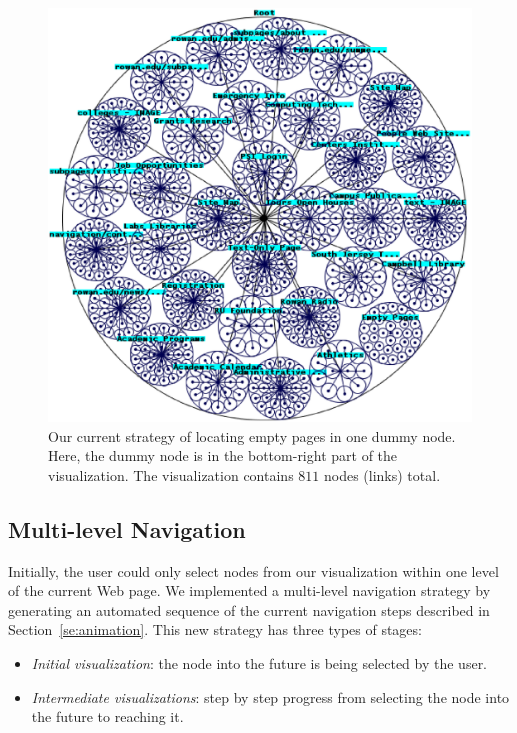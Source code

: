 \documentclass[]{article}
\begin{document}
{\begin{figure}[tb]
\centering
\includegraphics[width=5.0in]{images/dummy_nodes}
\caption{Our current strategy of locating empty pages in one dummy node. Here, the dummy node is in the bottom-right part of the visualization.
The visualization contains $811$ nodes (links) total.}
\label{fig_dummy}
\end{figure}

\subsection{Multi-level Navigation}
\label{ss:multi-level}

Initially, the user could only select nodes from our visualization within one level of the current Web page.
We implemented a multi-level navigation strategy by generating an automated sequence of the current navigation steps described in Section~\ref{se:animation}.
This new strategy has three types of stages:

\begin{itemize}

\item {\em Initial visualization}: the node into the future is being selected by the user.

\item {\em Intermediate visualizations}: step by step progress from selecting the node into the future to reaching it.


\end{itemize}}
\end{document}
